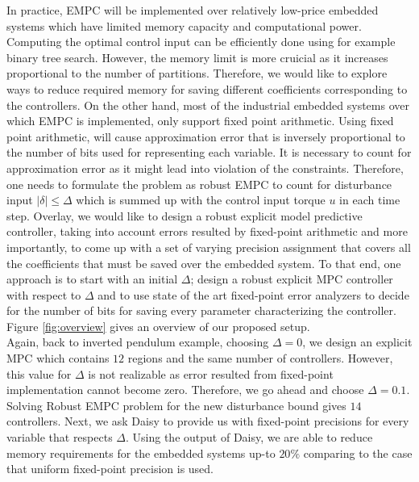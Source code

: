 	In practice, EMPC will be implemented over relatively low-price embedded systems which have limited memory capacity and computational power. Computing the optimal control input can be efficiently done using for example binary tree search. However, the memory limit is more cruicial as it increases proportional to the number of partitions.	Therefore, we would like to explore ways to reduce required memory for saving different coefficients corresponding to the controllers.
	On the other hand, most of the industrial embedded systems over which EMPC is implemented, only support fixed point arithmetic. Using fixed point arithmetic, will cause approximation error that is inversely proportional to the number of bits used for representing each variable. It is necessary to count for approximation error as it might lead into violation of the constraints. Therefore, one needs to formulate the problem as robust EMPC to count for disturbance input $|\delta|\leq \Delta$ which is summed up with the control input torque $u$ in each time step. %
	Overlay, we would like to design a robust explicit model predictive controller, taking into account errors resulted by fixed-point arithmetic and more importantly, to come up with a set of varying precision assignment that covers all the coefficients that must be saved over the embedded system. To that end, one approach is to start with an initial $\Delta$; design a robust explicit MPC controller with respect to $\Delta$ and to use state of the art fixed-point error analyzers to decide for the number of bits for saving every parameter characterizing the controller. Figure \ref{fig:overview} gives an overview of our proposed setup.\\
	Again, back to inverted pendulum example, choosing $\Delta=0$, we design an explicit MPC which contains $12$ regions and the same number of controllers. However, this value for $\Delta$ is not realizable as error resulted from fixed-point implementation cannot become zero. Therefore, we go ahead and choose $\Delta=0.1$. Solving Robust EMPC problem for the new disturbance bound gives $14$ controllers. Next, we ask Daisy to provide us with fixed-point precisions for every variable that respects $\Delta$. Using the output of Daisy, we are able to reduce memory requirements for the embedded systems up-to $20\%$ comparing to the case that uniform fixed-point precision is used.
	
